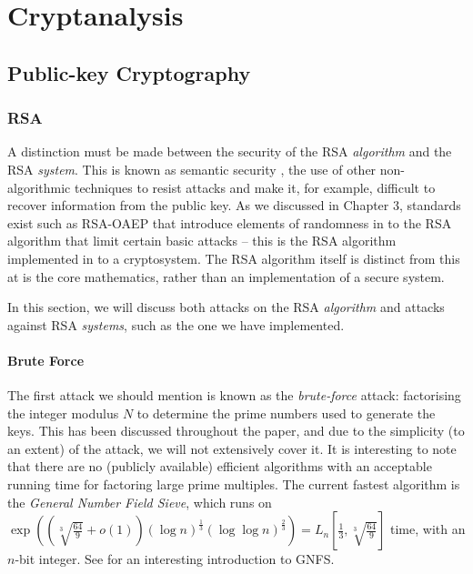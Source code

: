 
\chapter{Cryptanalysis} 
\label{Chapter7}

\section{Public-key Cryptography}

  \subsection{RSA}
    
    A distinction must be made between the security of the RSA \emph{algorithm} and the RSA \emph{system}. This is known as semantic security \cite{Goldwasse:1990aa}, the use of other non-algorithmic techniques to resist attacks and make it, for example, difficult to recover information from the public key. As we discussed in Chapter 3, standards exist such as RSA-OAEP that introduce elements of randomness in to the RSA algorithm that limit certain basic attacks -- this is the RSA algorithm implemented in to a cryptosystem. The RSA algorithm itself is distinct from this at is the core mathematics, rather than an implementation of a secure system.
    
    In this section, we will discuss both attacks on the RSA \emph{algorithm} and attacks against RSA \emph{systems}, such as the one we have implemented.
    
    \subsubsection{Brute Force}
    
      The first attack we should mention is known as the \emph{brute-force} attack: factorising the integer modulus $N$ to determine the prime numbers used to generate the keys. This has been discussed throughout the paper, and due to the simplicity (to an extent) of the attack, we will not extensively cover it. It is interesting to note that there are no (publicly available) efficient algorithms with an acceptable running time for factoring large prime multiples. The current fastest algorithm is the \emph{General Number Field Sieve}, which runs on $\exp\left( \left(\sqrt[3]{\frac{64}{9}} + o(1)\right)(\log n)^{\frac{1}{3}}(\log \log n)^{\frac{2}{3}}\right) =L_n\left[\frac{1}{3},\sqrt[3]{\frac{64}{9}}\right]$ time, with an $n$-bit integer. See \cite{Briggs:1998aa} for an interesting introduction to GNFS.
      
